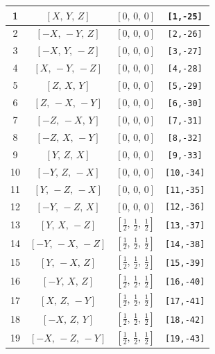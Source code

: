 \documentclass[fleqn,8pt]{jsarticle}
\begin{document}
\begin{longtable}{cccc}
1 & $\left[ X,\, Y,\, Z \right]$ & $\left[ 0,\, 0,\, 0 \right]$ & {\tt [1,-25]} \\ \hline
2 & $\left[ - X,\, - Y,\, Z \right]$ & $\left[ 0,\, 0,\, 0 \right]$ & {\tt [2,-26]} \\ \hline
3 & $\left[ - X,\, Y,\, - Z \right]$ & $\left[ 0,\, 0,\, 0 \right]$ & {\tt [3,-27]} \\ \hline
4 & $\left[ X,\, - Y,\, - Z \right]$ & $\left[ 0,\, 0,\, 0 \right]$ & {\tt [4,-28]} \\ \hline
5 & $\left[ Z,\, X,\, Y \right]$ & $\left[ 0,\, 0,\, 0 \right]$ & {\tt [5,-29]} \\ \hline
6 & $\left[ Z,\, - X,\, - Y \right]$ & $\left[ 0,\, 0,\, 0 \right]$ & {\tt [6,-30]} \\ \hline
7 & $\left[ - Z,\, - X,\, Y \right]$ & $\left[ 0,\, 0,\, 0 \right]$ & {\tt [7,-31]} \\ \hline
8 & $\left[ - Z,\, X,\, - Y \right]$ & $\left[ 0,\, 0,\, 0 \right]$ & {\tt [8,-32]} \\ \hline
9 & $\left[ Y,\, Z,\, X \right]$ & $\left[ 0,\, 0,\, 0 \right]$ & {\tt [9,-33]} \\ \hline
10 & $\left[ - Y,\, Z,\, - X \right]$ & $\left[ 0,\, 0,\, 0 \right]$ & {\tt [10,-34]} \\ \hline
11 & $\left[ Y,\, - Z,\, - X \right]$ & $\left[ 0,\, 0,\, 0 \right]$ & {\tt [11,-35]} \\ \hline
12 & $\left[ - Y,\, - Z,\, X \right]$ & $\left[ 0,\, 0,\, 0 \right]$ & {\tt [12,-36]} \\ \hline
13 & $\left[ Y,\, X,\, - Z \right]$ & $\left[ \frac{1}{2},\, \frac{1}{2},\, \frac{1}{2} \right]$ & {\tt [13,-37]} \\ \hline
14 & $\left[ - Y,\, - X,\, - Z \right]$ & $\left[ \frac{1}{2},\, \frac{1}{2},\, \frac{1}{2} \right]$ & {\tt [14,-38]} \\ \hline
15 & $\left[ Y,\, - X,\, Z \right]$ & $\left[ \frac{1}{2},\, \frac{1}{2},\, \frac{1}{2} \right]$ & {\tt [15,-39]} \\ \hline
16 & $\left[ - Y,\, X,\, Z \right]$ & $\left[ \frac{1}{2},\, \frac{1}{2},\, \frac{1}{2} \right]$ & {\tt [16,-40]} \\ \hline
17 & $\left[ X,\, Z,\, - Y \right]$ & $\left[ \frac{1}{2},\, \frac{1}{2},\, \frac{1}{2} \right]$ & {\tt [17,-41]} \\ \hline
18 & $\left[ - X,\, Z,\, Y \right]$ & $\left[ \frac{1}{2},\, \frac{1}{2},\, \frac{1}{2} \right]$ & {\tt [18,-42]} \\ \hline
19 & $\left[ - X,\, - Z,\, - Y \right]$ & $\left[ \frac{1}{2},\, \frac{1}{2},\, \frac{1}{2} \right]$ & {\tt [19,-43]} \\ \hline

\end{longtable}
\end{document}
